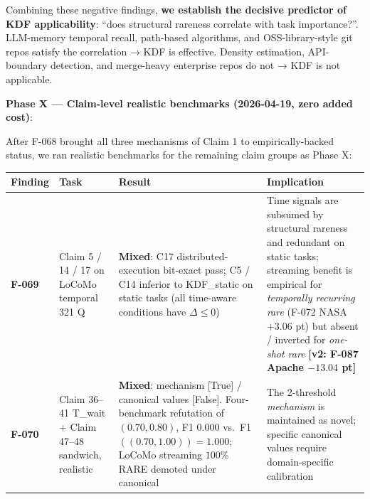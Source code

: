 Combining these negative findings, \textbf{we establish the decisive predictor of KDF applicability}: ``does structural rareness correlate with task importance?''. LLM-memory temporal recall, path-based algorithms, and OSS-library-style git repos satisfy the correlation → KDF is effective. Density estimation, API-boundary detection, and merge-heavy enterprise repos do not → KDF is not applicable.

\textbf{Phase X --- Claim-level realistic benchmarks (2026-04-19, zero added cost)}:

After F-068 brought all three mechanisms of Claim 1 to empirically-backed status, we ran realistic benchmarks for the remaining claim groups as Phase X:

{\def\LTcaptype{none} %
\begin{longtable}[]{@{}
  >{\raggedright\arraybackslash}p{}
  >{\raggedright\arraybackslash}p{}
  >{\raggedright\arraybackslash}p{}
  >{\raggedright\arraybackslash}p{}@{}}
\toprule\noalign{}
\begin{minipage}[b]{\linewidth}\raggedright
Finding
\end{minipage} & \begin{minipage}[b]{\linewidth}\raggedright
Task
\end{minipage} & \begin{minipage}[b]{\linewidth}\raggedright
Result
\end{minipage} & \begin{minipage}[b]{\linewidth}\raggedright
Implication
\end{minipage} \\
\midrule\noalign{}
\endhead
\bottomrule\noalign{}
\endlastfoot
\textbf{F-069} & Claim 5 / 14 / 17 on LoCoMo temporal 321 Q & \textbf{Mixed}: C17 distributed-execution bit-exact pass; C5 / C14 inferior to KDF\_static on static tasks (all time-aware conditions have \(\Delta \le 0\)) & Time signals are subsumed by structural rareness and redundant on static tasks; streaming benefit is empirical for \emph{temporally recurring rare} (F-072 NASA \(+3.06\) pt) but absent / inverted for \emph{one-shot rare} \textbf{{[}v2: F-087 Apache \(-13.04\) pt{]}} \\
\textbf{F-070} & Claim 36--41 T\_wait + Claim 47--48 sandwich, realistic & \textbf{Mixed}: mechanism {[}True{]} / canonical values {[}False{]}. Four-benchmark refutation of \((0.70, 0.80)\), F1 \(0.000\) vs.~F1\(((0.70, 1.00)) = 1.000\); LoCoMo streaming \(100\%\) RARE demoted under canonical & The 2-threshold \emph{mechanism} is maintained as novel; specific canonical values require domain-specific calibration \\

\end{longtable}}
